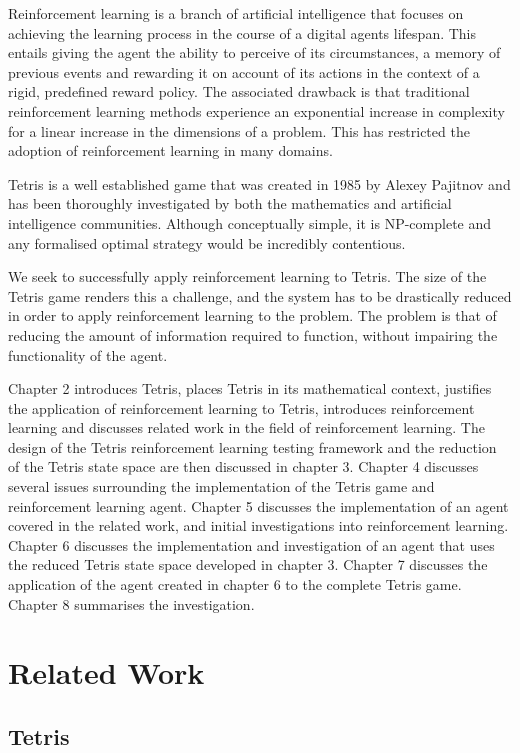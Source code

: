 \documentclass{rucsthesis}
\begin{document}
Reinforcement learning is a branch of artificial intelligence that focuses on achieving the learning process in the course of a digital agents lifespan. This entails giving the agent the ability to perceive of its circumstances, a memory of previous events and rewarding it on account of its actions in the context of a rigid, predefined reward policy. The associated drawback is that traditional reinforcement learning methods experience an exponential increase in complexity for a linear increase in the dimensions of a problem. This has restricted the adoption of reinforcement learning in many domains.

Tetris is a well established game that was created in 1985 by Alexey Pajitnov and has been thoroughly investigated by both the mathematics and artificial intelligence communities. Although conceptually simple, it is NP-complete \citep{hardtet} and any formalised optimal strategy would be incredibly contentious.

We seek to successfully apply reinforcement learning to Tetris. The size of the Tetris game renders this a challenge, and the system has to be drastically reduced in order to apply reinforcement learning to the problem. The problem is that of reducing the amount of information required to function, without impairing the functionality of the agent.

Chapter 2 introduces Tetris, places Tetris in its mathematical context, justifies the application of reinforcement learning to Tetris, introduces reinforcement learning and discusses related work in the field of reinforcement learning. The design of the Tetris reinforcement learning testing framework and the reduction of the Tetris state space are then discussed in chapter 3. Chapter 4 discusses several issues surrounding the implementation of the Tetris game and reinforcement learning agent. Chapter 5 discusses the implementation of an agent covered in the related work, and initial investigations into reinforcement learning. Chapter 6 discusses the implementation and investigation of an agent that uses the reduced Tetris state space developed in chapter 3. Chapter 7 discusses the application of the agent created in chapter 6 to the complete Tetris game. Chapter 8 summarises the investigation.

\chapter{Related Work}

\section{Tetris}
\end{document}
